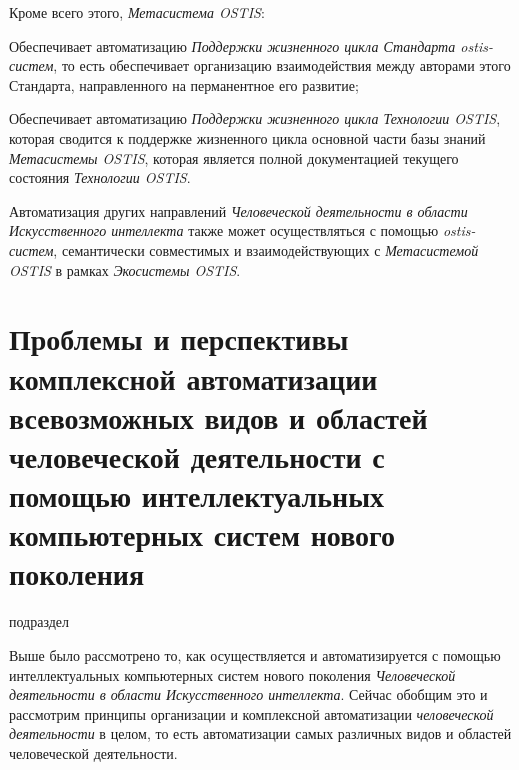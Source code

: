 Кроме всего этого, \textit{Метасистема OSTIS}: 
\begin{textitemize}
	\item Обеспечивает автоматизацию \textit{Поддержки жизненного цикла Стандарта ostis-систем}, то есть обеспечивает организацию взаимодействия между авторами этого Стандарта, направленного на перманентное его развитие;
	\item Обеспечивает автоматизацию \textit{Поддержки жизненного цикла Технологии OSTIS}, которая сводится к поддержке жизненного цикла основной части базы знаний \textit{Метасистемы OSTIS}, которая является полной документацией текущего состояния \textit{Технологии OSTIS}. 
\end{textitemize}

Автоматизация других направлений \textit{Человеческой деятельности в области Искусственного интеллекта} также может осуществляться с помощью \textit{ostis-систем}, семантически совместимых и взаимодействующих с \textit{Метасистемой OSTIS} в рамках \textit{Экосистемы OSTIS}.

\section{Проблемы и перспективы комплексной автоматизации всевозможных видов и областей человеческой деятельности с помощью интеллектуальных компьютерных систем нового поколения}
\label{sec_activity_perspectives}

\begin{SCn}
\begin{scnrelfromlist}{подраздел}
\end{scnrelfromlist}
\end{SCn}

Выше было рассмотрено то, как осуществляется и автоматизируется с помощью интеллектуальных компьютерных систем нового поколения  \textit{Человеческой деятельности в области Искусственного интеллекта}. Сейчас обобщим это и рассмотрим принципы организации и комплексной автоматизации \textit{человеческой деятельности} в целом, то есть автоматизации самых различных видов и областей человеческой деятельности.

